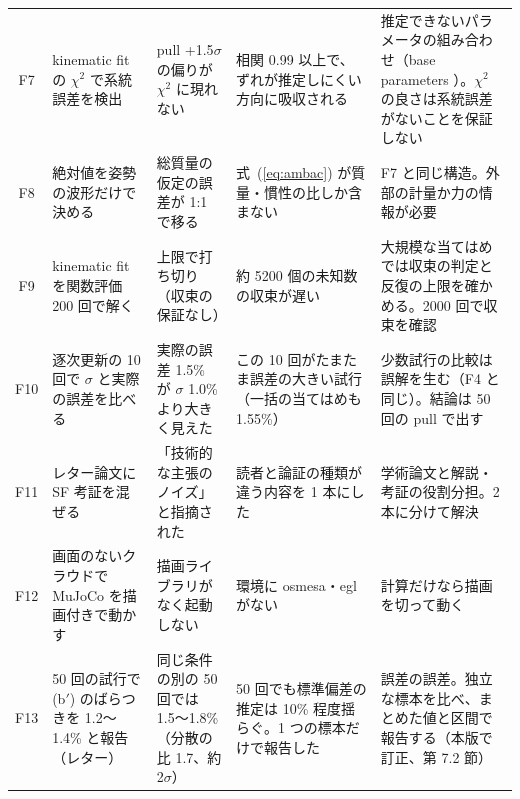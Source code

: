 \documentclass[paper=a4paper,fontsize=10pt,twocolumn,column_gap=2zw,line_length=24zw,number_of_lines=46,head_space=20mm]{jlreq}
\begin{document}
\begin{table}[t]
\begin{tabular}{cp{}p{}p{}p{}}
F7 & kinematic fit の $\chi^2$ で系統誤差を検出 & pull +1.5$\sigma$ の偏りが $\chi^2$ に現れない & 相関 0.99 以上で、ずれが推定しにくい方向に吸収される & 推定できないパラメータの組み合わせ（base parameters \cite{gautier1990}）。$\chi^2$ の良さは系統誤差がないことを保証しない \\
F8 & 絶対値を姿勢の波形だけで決める & 総質量の仮定の誤差が 1:1 で移る & 式~(\ref{eq:ambac}) が質量・慣性の比しか含まない & F7 と同じ構造。外部の計量か力の情報が必要 \\
F9 & kinematic fit を関数評価 200 回で解く & 上限で打ち切り（収束の保証なし） & 約 5200 個の未知数の収束が遅い & 大規模な当てはめでは収束の判定と反復の上限を確かめる。2000 回で収束を確認 \\
F10 & 逐次更新の 10 回で $\sigma$ と実際の誤差を比べる & 実際の誤差 1.5\% が $\sigma$ 1.0\% より大きく見えた & この 10 回がたまたま誤差の大きい試行（一括の当てはめも 1.55\%） & 少数試行の比較は誤解を生む（F4 と同じ）。結論は 50 回の pull で出す \\
F11 & レター論文に SF 考証を混ぜる & 「技術的な主張のノイズ」と指摘された & 読者と論証の種類が違う内容を 1 本にした & 学術論文と解説・考証の役割分担。2 本に分けて解決 \\
F12 & 画面のないクラウドで MuJoCo を描画付きで動かす & 描画ライブラリがなく起動しない & 環境に osmesa・egl がない & 計算だけなら描画を切って動く \\
F13 & 50 回の試行で (b$'$) のばらつきを 1.2〜1.4\% と報告（レター） & 同じ条件の別の 50 回では 1.5〜1.8\%（分散の比 1.7、約 2$\sigma$） & 50 回でも標準偏差の推定は 10\% 程度揺らぐ。1 つの標本だけで報告した & 誤差の誤差。独立な標本を比べ、まとめた値と区間で報告する（本版で訂正、第 7.2 節） \\\bottomrule
\end{tabular}
\end{table}
\end{document}
